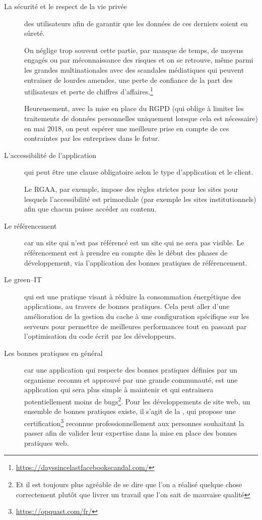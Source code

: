 \begin{description}
	\item [La sécurité et le respect de la vie privée] des utilisateurs afin de garantir que les données de ces derniers soient en sûreté. 
	
	On néglige trop souvent cette partie, par manque de temps, de moyens engagés ou par méconnaissance des risques et on se retrouve, même parmi les grandes multinationales avec des scandales médiatiques qui peuvent entrainer de lourdes amendes, une perte de confiance de la part des utilisateurs et perte de chiffres d'affaires.\footnote{\url{https://dayssincelastfacebookscandal.com/}}
	
	Heureusement, avec la mise en place du \gls{RGPD} (qui oblige à limiter les traitements de données personnelles uniquement lorsque cela est nécessaire) en mai 2018, on peut espérer une meilleure prise en compte de ces contraintes par les entreprises dans le futur.
	\item [L'accessibilité de l'application] qui peut être une clause obligatoire selon le type d'application et le client.
	
	Le \gls{RGAA}, par exemple, impose des règles strictes pour les sites pour lesquels l'accessibilité est primordiale (par exemple les sites institutionnels) afin que chacun puisse accéder au contenu.
	\item [Le référencement] car un site qui n'est pas référencé est un site qui ne sera pas visible. Le référencement est à prendre en compte dès le début des phases de développement, via l'application des bonnes pratiques de référencement.
	\item [Le green--IT] qui est une pratique visant à réduire la consommation énergétique des applications, au travers de bonnes pratiques. Cela peut aller d'une amélioration de la gestion du cache à une configuration spécifique sur les serveurs pour permettre de meilleures performances tout en passant par l'optimisation du code écrit par les développeurs.
	\item [Les bonnes pratiques en général] car une application qui respecte des bonnes pratiques définies par un organisme reconnu et approuvé par une grande communauté, est une application qui sera plus simple à maintenir et qui entrainera potentiellement moins de bugs\footnote{Et il est toujours plus agréable de se dire que l'on a réalisé quelque chose correctement plutôt que livrer un travail que l'on sait de mauvaise qualité}. Pour les développements de site web, un ensemble de bonnes pratiques existe, il s'agit de la  \cite{opquast-best-practices}, qui propose une certification\footnote{\url{https://opquast.com/fr/}} reconnue professionnellement aux personnes souhaitant la passer afin de valider leur expertise dans la mise en place des bonnes pratiques web.
\end{description}

